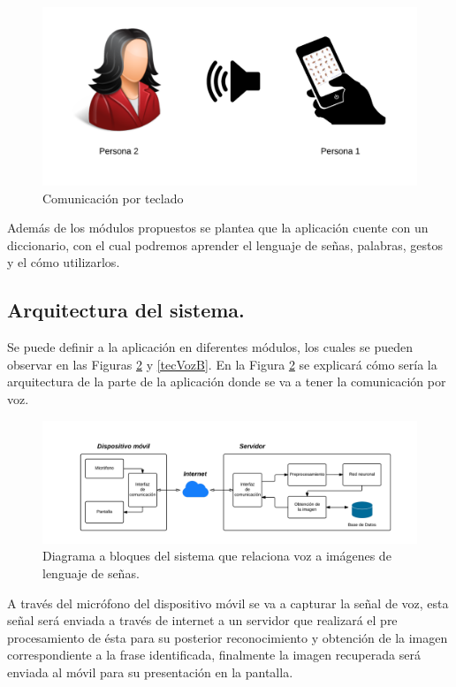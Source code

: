 	\begin{figure}[H]
		\centering
		\includegraphics[scale = 0.8]{figures/ComunicacionAB}
		\caption{Comunicación por teclado}
		\label{comunicacionTeclado}
	\end{figure}
	
	Además de los módulos propuestos se plantea que la aplicación cuente con un diccionario, con el cual podremos aprender el lenguaje de señas, palabras, gestos y el cómo utilizarlos.

		\subsection*{Arquitectura del sistema.}
		
		Se puede definir a la aplicación en diferentes módulos, los cuales se pueden observar en las Figuras \ref{vozSenB} y \ref{tecVozB}.
		En la Figura \ref{vozSenB} se explicará cómo sería la arquitectura de la parte de la aplicación donde se va a tener la comunicación por voz.

		\begin{figure}[H]
			\centering
			\includegraphics[scale = 0.7]{figures/Etapavoz}
			\caption{Diagrama a bloques del sistema que relaciona voz a imágenes de lenguaje de señas.}
			\label{vozSenB}
		\end{figure}		

		A través del micrófono del dispositivo móvil se va a capturar la señal de voz, esta señal será enviada a través de internet a un servidor que realizará el pre procesamiento de ésta para su posterior reconocimiento y obtención de la imagen correspondiente a la frase identificada, finalmente la imagen recuperada será enviada al móvil para su presentación en la pantalla.

